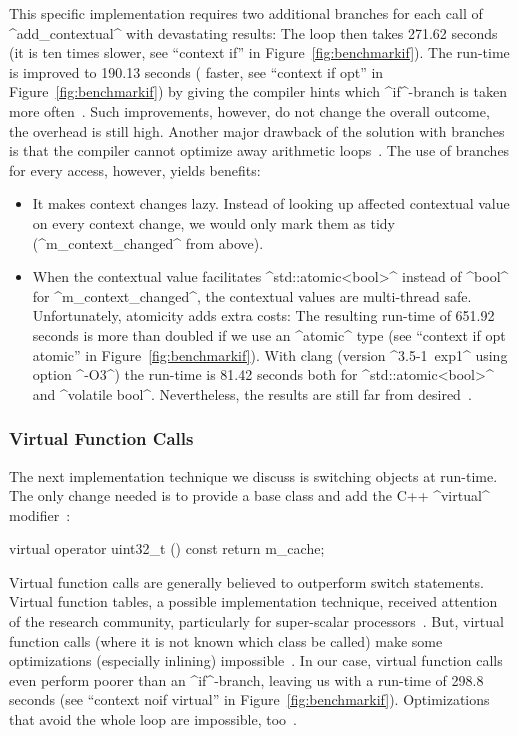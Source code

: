 This specific implementation requires two additional branches for each call of \linebreak ^add_contextual^ with devastating results:
The loop then takes 271.62 seconds (it is ten times slower, see ``context if'' in Figure~\ref{fig:benchmarkif}).
The run-time is improved to 190.13 seconds ( faster, see ``context if opt''  in Figure~\ref{fig:benchmarkif}) by giving the compiler hints which ^if^-branch is taken more often~\cite{raab2014program}.
Such improvements, however, do not change the overall outcome, the overhead is still high.
Another major drawback of the solution with branches is that the compiler cannot optimize away arithmetic loops~\cite{raab2014program}.
The use of branches for every access, however, yields benefits:
\begin{itemize}
\item
It makes context changes lazy.
Instead of looking up affected contextual value on every context change, we would only mark them as tidy (^m_context_changed^ from above).
\item
When the contextual value facilitates ^std::atomic<bool>^ instead of ^bool^ for ^m_context_changed^, the contextual values are multi-thread safe.
Unfortunately, atomicity adds extra costs:
The resulting run-time of 651.92 seconds is more than doubled if we use an ^atomic^ type (see ``context if opt atomic''  in Figure~\ref{fig:benchmarkif}).
With clang (version ^3.5-1~exp1^ using option ^-O3^) the run-time is 81.42 seconds both for ^std::atomic<bool>^ and ^volatile bool^.
Nevertheless, the results are still far from desired~\cite{raab2014program}.
\end{itemize}


\subsubsection{Virtual Function Calls}


The next implementation technique we discuss is switching objects at run-time.
The only change needed is to provide a base class and add the C++ ^virtual^ modifier~\cite{raab2014program}:

\begin{code}[language=Cpp]
virtual operator uint32_t () const
{
	return m_cache;
}
\end{code}

Virtual function calls are generally believed to outperform switch statements.
Virtual function tables, a possible implementation technique, received attention of the research community, particularly for super-scalar processors~\cite{driesen1996direct,bacon1996fast,calder1994reducing}.
But, virtual function calls (where it is not known which class be called) make some optimizations (especially inlining) impossible~\cite{driesen1996direct}.
In our case, virtual function calls even perform poorer than an ^if^-branch, leaving us with a run-time of 298.8 seconds (see ``context noif virtual''  in Figure~\ref{fig:benchmarkif}).
Optimizations that avoid the whole loop are impossible, too~\cite{raab2014program}.


